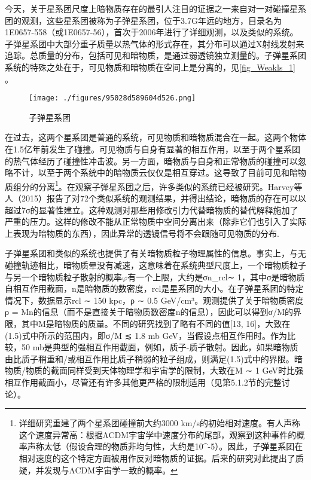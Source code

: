 

今天，关于星系团尺度上暗物质存在的最引人注目的证据之一来自对一对碰撞星系团的观测，这些星系团被称为子弹星系团，位于3.7G年远的地方，目录名为1E0657-558（或1E0657-56），首次于2006年进行了详细观测，以及类似的系统。子弹星系团中大部分重子质量以热气体的形式存在，其分布可以通过X射线发射来追踪。总质量的分布，包括可见和暗物质，是通过弱透镜独立测量的。子弹星系团系统的特殊之处在于，可见物质和暗物质在空间上是分离的，见\autoref{fig_Weakls_1} 。\begin{figure}[ht]
\centering
\texttt{[image: ./figures/95028d589604d526.png]}
\caption{子弹星系团} \label{fig_Weakls_1}
\end{figure}
在过去，这两个星系团是普通的系统，可见物质和暗物质混合在一起。这两个物体在1.5亿年前发生了碰撞。可见物质与自身有显著的相互作用，以至于两个星系团的热气体经历了碰撞性冲击波。另一方面，暗物质与自身和正常物质的碰撞可以忽略不计，以至于两个系统中的暗物质云仅仅是相互穿过。这导致了目前可见和暗物质组分的分离\footnote{详细研究重建了两个星系团碰撞前大约3000 km/s的初始相对速度。有人声称这个速度异常高：根据ΛCDM宇宙学中速度分布的尾部，观察到这种事件的概率声称太低（假设合理的物质非均匀性，大约是10^-5）。因此，子弹星系团在相对速度的这个特定方面被用作反对暗物质的证据。后来的研究对此提出了质疑，并发现与ΛCDM宇宙学一致的概率。}。在观察子弹星系团之后，许多类似的系统已经被研究。Harvey等人（2015）报告了对72个类似系统的观测结果，并得出结论，暗物质的存在可以以超过7σ的显著性建立。这种观测对那些用修改引力代替暗物质的替代解释施加了严重的压力。这样的修改不能从正常物质中空间分离出来（除非它们也引入了实际上表现为暗物质的东西），因此异常的透镜信号将不会跟随可见物质的分布.

子弹星系团和类似的系统也提供了有关暗物质粒子物理属性的信息。事实上，与无碰撞轨迹相比，暗物质晕没有减速，这意味着在系统典型尺度上，一个暗物质粒子与另一个暗物质粒子散射的概率$\varphi$有一个上限，大约是σn_{rcl}∼ 1，其中σ是暗物质自相互作用截面，n是暗物质的数密度，rcl是星系团的大小。在子弹星系团的特定情况下，数据显示rcl ∼ 150 kpc，ρ ∼ 0.5 GeV/cm³。观测提供了关于暗物质密度ρ = Mn的信息（而不是直接关于暗物质数密度n的信息），因此可以得到σ/M的界限，其中M是暗物质的质量。不同的研究找到了略有不同的值[13, 16]，大致在(1.5)式中所示的范围内，即σ/M ≲ 1.8 mb GeV，当假设点相互作用时。作为比较，50 mb是典型的强相互作用截面，例如，质子-质子散射。因此，如果暗物质由比质子稍重和/或相互作用比质子稍弱的粒子组成，则满足(1.5)式中的界限。暗物质/物质的截面同样受到天体物理学和宇宙学的限制，大致在M ∼ 1 GeV时比强相互作用截面小，尽管还有许多其他更严格的限制适用（见第5.1.2节的完整讨论）。

